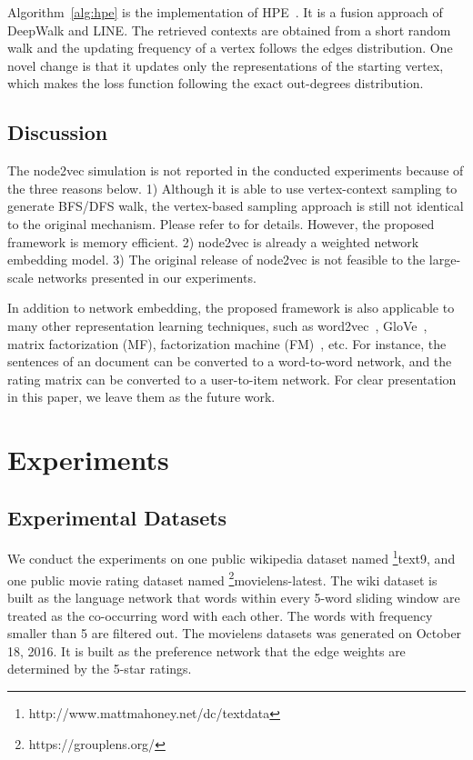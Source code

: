 Algorithm~\ref{alg:hpe} is the implementation of HPE~\cite{hpe}.  It is a fusion approach of DeepWalk and LINE.  The retrieved contexts are obtained from a short random walk and the updating frequency of a vertex follows the edges distribution.  One novel change is that it updates only the representations of the starting vertex, which makes the loss function following the exact out-degrees distribution.


\subsection{Discussion}
The node2vec simulation is not reported in the conducted experiments because of the three reasons below. 1) Although it is able to use vertex-context sampling to generate BFS/DFS walk, the vertex-based sampling approach is still not identical to the original mechanism. Please refer to \cite{n2v} for details. However, the proposed framework is memory efficient. 2) node2vec is already a weighted network embedding model. 3) The original release of node2vec is not feasible to the large-scale networks presented in our experiments.

In addition to network embedding, the proposed framework is also applicable to many other representation learning techniques, such as word2vec~\cite{w2v}, GloVe~\cite{glove}, matrix factorization (MF), factorization machine (FM)~\cite{fm}, etc. For instance, the sentences of an document can be converted to a word-to-word network, and the rating matrix can be converted to a user-to-item network. For clear presentation in this paper, we leave them as the future work.




\section{Experiments}\label{sec:exp}

\subsection{Experimental Datasets}

We conduct the experiments on one public wikipedia dataset named \footnote{http://www.mattmahoney.net/dc/textdata}{text9}, and one public movie rating dataset named \footnote{https://grouplens.org/}{movielens-latest}. The wiki dataset is built as the language network that words within every 5-word sliding window are treated as the co-occurring word with each other. The words with frequency smaller than 5 are filtered out.  The movielens datasets was generated on October 18, 2016. It is built as the preference network that the edge weights are determined by the 5-star ratings.  


